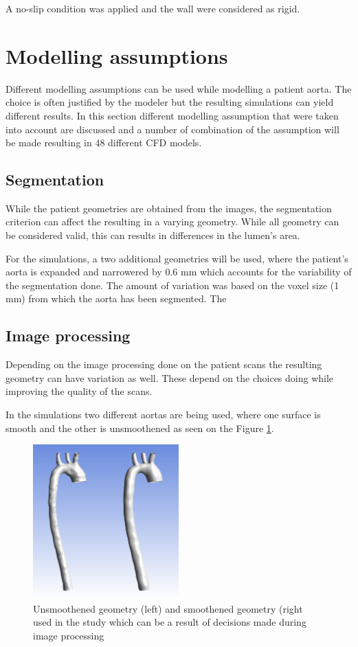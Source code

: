 A no-slip condition was applied and the wall were considered as rigid. \par

\section{Modelling assumptions}
Different modelling assumptions can be used while modelling a patient aorta. The choice is often justified by the modeler but the resulting simulations can yield different results. In this section different modelling assumption that were taken into account are discussed and a number of combination of the assumption will be made resulting in 48 different CFD models.

\subsection{Segmentation}
While the patient geometries are obtained from the images, the segmentation criterion can affect the resulting in a varying geometry. While all geometry can be considered valid, this can results in differences in the lumen's area. \par

For the simulations, a two additional geometries will be used, where the patient's aorta is expanded and narrowered by 0.6 mm which accounts for the variability of the segmentation done. The amount of variation was based on the voxel size (1 mm) from which the aorta has been segmented. The \par

\subsection{Image processing}
Depending on the image processing done on the patient scans the resulting geometry can have variation as well. These depend on the choices doing while improving the quality of the scans. \par

In the simulations two different aortas are being used, where one surface is smooth and the other is unsmoothened as seen on the Figure \ref{fig:geometry}.

\begin{figure}[ht!]
    \centering
    \includegraphics[width=0.5\textwidth]{Figures/Geometry.png}
    \caption{Unsmoothened geometry (left) and smoothened geometry (right used in the study which can be a result of decisions made during image processing}
    \label{fig:geometry}
\end{figure}

